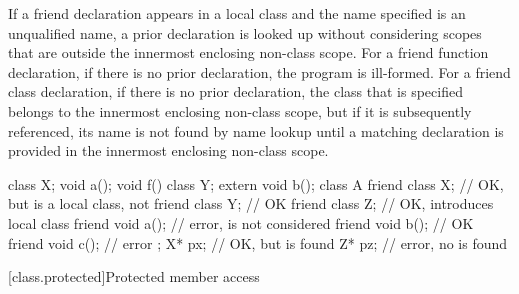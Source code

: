 \pnum
{}%
%
If a friend declaration appears in a local class and the
name specified is an unqualified name, a prior declaration is looked
up without considering scopes that are outside the innermost enclosing
non-class scope.
For a friend function declaration, if there is no
prior declaration, the program is ill-formed.
For a friend class
declaration, if there is no prior declaration, the class that is
specified belongs to the innermost enclosing non-class scope, but if it is
subsequently referenced, its name is not found by name lookup
until a matching declaration is provided in the innermost enclosing
non-class scope.
\begin{example}

\begin{codeblock}
class X;
void a();
void f() {
  class Y;
  extern void b();
  class A {
  friend class X;   // OK, but  is a local class, not 
  friend class Y;   // OK
  friend class Z;   // OK, introduces local class 
  friend void a();  // error,  is not considered
  friend void b();  // OK
  friend void c();  // error
  };
  X* px;            // OK, but  is found
  Z* pz;            // error, no  is found
}
\end{codeblock}
\end{example}

[class.protected]{Protected member access}
%

